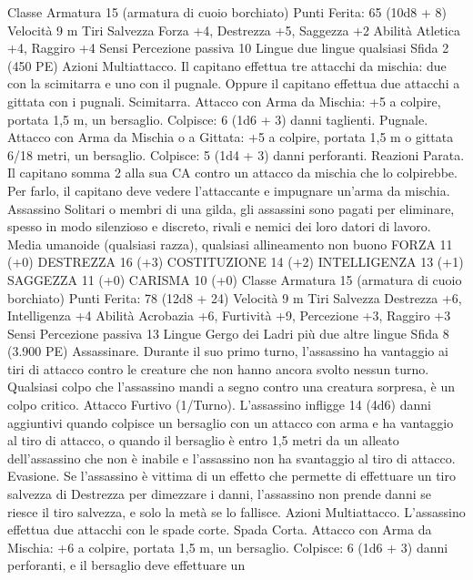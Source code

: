 \begin{multicols}{2}
Classe Armatura 15 (armatura di cuoio borchiato)
\hspace*{0pt}\hfill{Punti Ferita}: 65 (10d8 + 8)
Velocità 9 m
Tiri Salvezza Forza +4, Destrezza +5, Saggezza +2
Abilità Atletica +4, Raggiro +4
Sensi Percezione passiva 10
Lingue due lingue qualsiasi
Sfida 2 (450 PE)
Azioni
Multiattacco. Il capitano effettua tre attacchi da mischia: due con
la scimitarra e uno con il pugnale. Oppure il capitano effettua
due attacchi a gittata con i pugnali.
Scimitarra. Attacco con Arma da Mischia: +5 a colpire, portata
1,5 m, un bersaglio.
Colpisce: 6 (1d6 + 3) danni taglienti.
Pugnale. Attacco con Arma da Mischia o a Gittata: +5 a colpire,
portata 1,5 m o gittata 6/18 metri, un bersaglio.
Colpisce: 5 (1d4 + 3) danni perforanti.
Reazioni
Parata. Il capitano somma 2 alla sua CA contro un attacco da
mischia che lo colpirebbe. Per farlo, il capitano deve vedere
l’attaccante e impugnare un’arma da mischia.
Assassino
Solitari o membri di una gilda, gli assassini sono pagati
per eliminare, spesso in modo silenzioso e discreto,
rivali e nemici dei loro datori di lavoro.
Media umanoide (qualsiasi razza), qualsiasi allineamento non
buono
FORZA 11 (+0)
DESTREZZA 16 (+3)
COSTITUZIONE 14 (+2)
INTELLIGENZA 13 (+1)
SAGGEZZA 11 (+0)
CARISMA 10 (+0)
Classe Armatura 15 (armatura di cuoio borchiato)
\hspace*{0pt}\hfill{Punti Ferita}: 78 (12d8 + 24)
Velocità 9 m
Tiri Salvezza Destrezza +6, Intelligenza +4
Abilità Acrobazia +6, Furtività +9, Percezione +3, Raggiro +3
Sensi Percezione passiva 13
Lingue Gergo dei Ladri più due altre lingue
Sfida 8 (3.900 PE)
Assassinare. Durante il suo primo turno, l’assassino ha
vantaggio ai tiri di attacco contro le creature che non hanno
ancora svolto nessun turno. Qualsiasi colpo che l’assassino
mandi a segno contro una creatura sorpresa, è un colpo critico.
Attacco Furtivo (1/Turno). L’assassino infligge 14 (4d6) danni
aggiuntivi quando colpisce un bersaglio con un attacco con arma
e ha vantaggio al tiro di attacco, o quando il bersaglio è entro 1,5
metri da un alleato dell’assassino che non è inabile e l’assassino
non ha svantaggio al tiro di attacco.
Evasione. Se l’assassino è vittima di un effetto che permette di
effettuare un tiro salvezza di Destrezza per dimezzare i danni,
l’assassino non prende danni se riesce il tiro salvezza, e solo la
metà se lo fallisce.
Azioni
Multiattacco. L’assassino effettua due attacchi con le spade corte.
Spada Corta. Attacco con Arma da Mischia: +6 a colpire, portata
1,5 m, un bersaglio.
Colpisce: 6 (1d6 + 3) danni perforanti, e il bersaglio deve effettuare un

\end{multicols}
